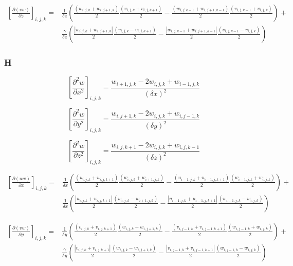 \documentclass[10pt]{article}
\begin{document}
\begin{equation}
\begin{split}
\left[\frac{\partial(vw)}{\partial z}\right]_{i,j,k} = &
\frac{1}{\delta z}
\left(
	\frac{(w_{i,j,k}+w_{i,j+1,k})}{2} \frac{(v_{i,j,k}+v_{i,j,k+1})}{2} -
	\frac{(w_{i,j,k-1}+w_{i,j+1,k-1})}{2} \frac{(v_{i,j,k-1}+v_{i,j,k})}{2}
\right) + \\
& \frac{\gamma}{\delta z}
\left(
	\frac{|w_{i,j,k}+w_{i,j+1,k}|}{2} \frac{(v_{i,j,k}-v_{i,j,k+1})}{2} -
	\frac{|w_{i,j,k-1}+w_{i,j+1,k-1}|}{2} \frac{(v_{i,j,k-1}-v_{i,j,k})}{2}
\right)
\end{split}
\end{equation}

\subsubsection{H}
\begin{equation}
\left[\frac{\partial^2 w}{\partial x^2}\right]_{i,j,k} =
\frac{w_{i+1,j,k} - 2w_{i,j,k} + w_{i-1,j,k}}{(\delta x)^2}
\end{equation}

\begin{equation}
\left[\frac{\partial^2 w}{\partial y^2}\right]_{i,j,k} =
\frac{w_{i,j+1,k} - 2w_{i,j,k} + w_{i,j-1,k}}{(\delta y)^2}
\end{equation}

\begin{equation}
\left[\frac{\partial^2 w}{\partial z^2}\right]_{i,j,k} =
\frac{w_{i,j,k+1} - 2w_{i,j,k} + w_{i,j,k-1}}{(\delta z)^2}
\end{equation}

\begin{equation}
\begin{split}
\left[\frac{\partial(uw)}{\partial x}\right]_{i,j,k} = &
\frac{1}{\delta x}
\left(
	\frac{(u_{i,j,k}+u_{i,j,k+1})}{2} \frac{(w_{i,j,k}+w_{i+1,j,k})}{2} -
	\frac{(u_{i-1,j,k}+u_{i-1,j,k+1})}{2} \frac{(w_{i-1,j,k}+w_{i,j,k})}{2}
\right) + \\
& \frac{1}{\delta x}
\left(
	\frac{|u_{i,j,k}+u_{i,j,k+1}|}{2} \frac{(w_{i,j,k}-w_{i+1,j,k})}{2} -
	\frac{|u_{i-1,j,k}+u_{i-1,j,k+1}|}{2} \frac{(w_{i-1,j,k}-w_{i,j,k})}{2}
\right)
\end{split}
\end{equation}

\begin{equation}
\begin{split}
\left[\frac{\partial(vw)}{\partial y}\right]_{i,j,k} = &
\frac{1}{\delta y}
\left(
	\frac{(v_{i,j,k}+v_{i,j,k+1})}{2} \frac{(w_{i,j,k}+w_{i,j+1,k})}{2} -
	\frac{(v_{i,j-1,k}+v_{i,j-1,k+1})}{2} \frac{(w_{i,j-1,k}+w_{i,j,k})}{2}
\right) + \\
& \frac{\gamma}{\delta y}
\left(
	\frac{|v_{i,j,k}+v_{i,j,k+1}|}{2} \frac{(w_{i,j,k}-w_{i,j+1,k})}{2} -
	\frac{|v_{i,j-1,k}+v_{i,j-1,k+1}|}{2} \frac{(w_{i,j-1,k}-w_{i,j,k})}{2}
\right)
\end{split}
\end{equation}
\end{document}
